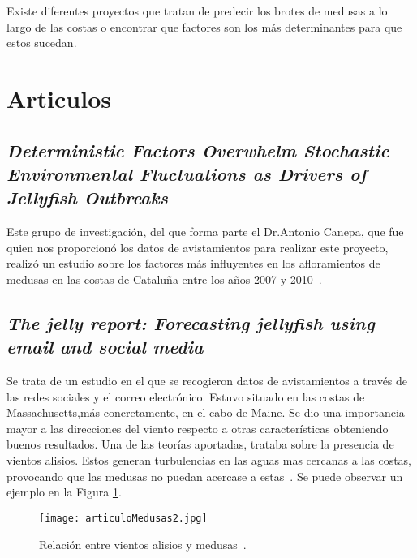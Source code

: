 

Existe diferentes proyectos que tratan de predecir los brotes de medusas a lo largo de las costas o encontrar que factores son los más determinantes para que estos sucedan.

\section{Articulos}

\subsection{\emph{Deterministic Factors Overwhelm Stochastic Environmental Fluctuations as Drivers of Jellyfish Outbreaks}}

Este grupo de investigación, del que forma parte el Dr.Antonio Canepa, que fue quien nos proporcionó los datos de avistamientos para realizar este proyecto, realizó un estudio sobre los factores más influyentes en los afloramientos de medusas en las costas de Cataluña entre los años 2007 y 2010~\cite{art:ArticuloCanepa_1}.

\subsection{\emph{The jelly report: Forecasting jellyfish using email and social media}}

Se trata de un estudio en el que se recogieron datos de avistamientos a través de las redes sociales y el correo electrónico. Estuvo situado en las costas de Massachusetts,más concretamente, en el cabo de Maine. Se dio una importancia mayor a las direcciones del viento respecto a otras características obteniendo buenos resultados. Una de las teorías aportadas, trataba sobre la presencia de vientos alisios. Estos generan turbulencias en las aguas mas cercanas a las costas, provocando que las medusas no puedan acercase a estas~\cite{articulomedusas2}. Se puede observar un ejemplo en la Figura \ref{articulomedusas2}.
\begin{figure}%
	\centering
	\texttt{[image: articuloMedusas2.jpg]}
	\caption[Relación entre vientos alisios y medusas]{Relación entre vientos alisios y medusas~\cite{articulomedusas2}.}\label{articulomedusas2}
\end{figure}


